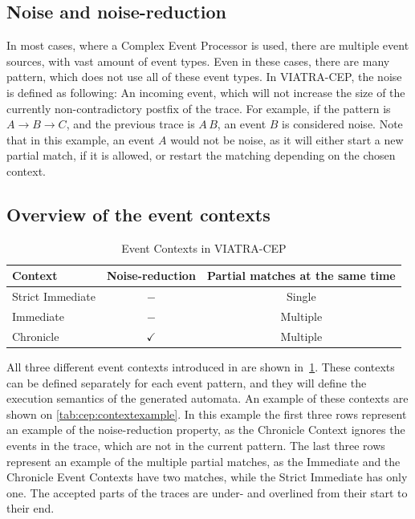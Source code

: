 \subsection{Noise and noise-reduction}
In most cases, where a Complex Event Processor is used, there are multiple event sources, with vast amount of event types.
Even in these cases, there are many pattern, which does not use all of these event types.
In VIATRA-CEP, the noise is defined as following: An incoming event, which will not increase the size of the currently non-contradictory postfix of the trace.
For example, if the pattern is $A \rightarrow B \rightarrow C$, and the previous trace is $A\,B$, an event $B$ is considered noise. Note that in this example, an event $A$ would not be noise, as it will either start a new partial match, if it is allowed, or restart the matching depending on the chosen context.

\subsection{Overview of the event contexts}

\begin{table}
	\caption{Event Contexts in VIATRA-CEP}		
	\label{tab:cep:contexts}
	\begin{tabularx}{\textwidth}{lcc}
		\toprule
		Context & Noise-reduction & Partial matches at the same time \\
		\midrule
		Strict Immediate & $-$ & Single \\
		Immediate & $-$ & Multiple \\
		Chronicle & $\checkmark$ & Multiple \\
		\bottomrule
	\end{tabularx}
\end{table}

All three different event contexts introduced in \citep{davidi} are shown in~\cref{tab:cep:contexts}.
These contexts can be defined separately for each event pattern, and they will define the execution semantics of the generated automata. 
An example of these contexts are shown on \cref{tab:cep:contextexample}. In this example the first three rows represent an example of the noise-reduction property, as the Chronicle Context ignores the events in the trace, which are not in the current pattern.
The last three rows represent an example of the multiple partial matches, as the Immediate and the Chronicle Event Contexts have two matches, while the Strict Immediate has only one.
The accepted parts of the traces are under- and overlined from their start to their end.


